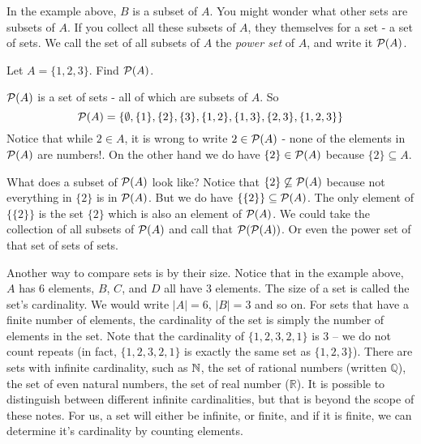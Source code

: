 \documentclass[12pt]{article}
\begin{document}
In the example above, $B$ is a subset of $A$.  You might wonder what other sets are subsets of $A$.  If you collect all these subsets of $A$, they themselves for a set - a set of sets.  We call the set of all subsets of $A$ the \emph{power set} of $A$, and write it $\mathcal P(A)$.  

\begin{example}
  Let $A = \{1,2,3\}$.  Find $\mathcal P(A)$.
  \begin{solution}
    $\mathcal P(A)$ is a set of sets - all of which are subsets of $A$.  So
    \[\mathcal P(A) = \{ \emptyset, \{1\}, \{2\}, \{3\}, \{1,2\}, \{1, 3\}, \{2,3\}, \{1,2,3\}\}\]
    Notice that while $2 \in A$, it is wrong to write $2 \in \mathcal P(A)$ - none of the elements in $\mathcal P(A)$ are numbers!.  On the other hand we do have $\{2\} \in \mathcal P(A)$ because $\{2\} \subseteq A$.  
    
    What does a subset of $\mathcal P(A)$ look like?  Notice that $\{2\} \not\subseteq \mathcal P(A)$ because not everything in $\{2\}$ is in $\mathcal P(A)$.  But we do have $\{ \{2\} \} \subseteq \mathcal P(A)$.  The only element of $\{\{2\}\}$ is the set $\{2\}$ which is also an element of $\mathcal P(A)$.  We could take the collection of all subsets of $\mathcal P(A)$ and call that $\mathcal P(\mathcal P(A))$.  Or even the power set of that set of sets of sets. 
  \end{solution}

\end{example}


Another way to compare sets is by their size.  Notice that in the example above, $A$ has 6 elements, $B$, $C$, and $D$ all have 3 elements.  The size of a set is called the set's cardinality.  We would write $|A| = 6$, $|B| = 3$ and so on.  For sets that have a finite number of elements, the cardinality of the set is simply the number of elements in the set.  Note that the cardinality of $\{ 1, 2, 3, 2, 1\}$ is 3 -- we do not count repeats (in fact, $\{1, 2, 3, 2, 1\}$ is exactly the same set as $\{1, 2, 3\}$).  There are sets with infinite cardinality, such as $\mathbb N$, the set of rational numbers (written $\mathbb Q$), the set of even natural numbers, the set of real number ($\mathbb R$).  It is possible to distinguish between different infinite cardinalities, but that is beyond the scope of these notes.  For us, a set will either be infinite, or finite, and if it is finite, we can determine it's cardinality by counting elements.
\end{document}
